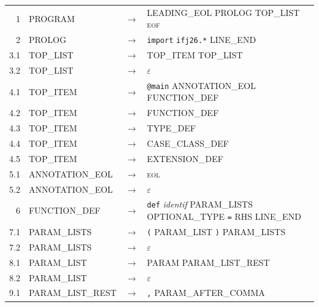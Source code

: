 \documentclass[11pt,a4paper]{article}
\begin{document}
 
{\small
\setlength{\tabcolsep}{4pt}
\begin{longtable}{r l c >{\raggedright\arraybackslash}p{6.6cm} >{\raggedright\arraybackslash}p{3.2cm}}
1 & \textsf{PROGRAM} & $\rightarrow$ & \textsf{LEADING\_EOL} \textsf{PROLOG} \textsf{TOP\_LIST} \textsc{eof} & {\scriptsize } \\
2 & \textsf{PROLOG} & $\rightarrow$ & \texttt{import} \texttt{ifj26.*} \textsf{LINE\_END} & {\scriptsize } \\
3.1 & \textsf{TOP\_LIST} & $\rightarrow$ & \textsf{TOP\_ITEM} \textsf{TOP\_LIST} & {\scriptsize } \\
3.2 & \textsf{TOP\_LIST} & $\rightarrow$ & $\varepsilon$ & {\scriptsize } \\
4.1 & \textsf{TOP\_ITEM} & $\rightarrow$ & \texttt{@main} \textsf{ANNOTATION\_EOL} \textsf{FUNCTION\_DEF} & {\scriptsize } \\
4.2 & \textsf{TOP\_ITEM} & $\rightarrow$ & \textsf{FUNCTION\_DEF} & {\scriptsize } \\
4.3 & \textsf{TOP\_ITEM} & $\rightarrow$ & \textsf{TYPE\_DEF} & {\scriptsize } \\
4.4 & \textsf{TOP\_ITEM} & $\rightarrow$ & \textsf{CASE\_CLASS\_DEF} & {\scriptsize } \\
4.5 & \textsf{TOP\_ITEM} & $\rightarrow$ & \textsf{EXTENSION\_DEF} & {\scriptsize } \\
5.1 & \textsf{ANNOTATION\_EOL} & $\rightarrow$ & \textsc{eol} & {\scriptsize } \\
5.2 & \textsf{ANNOTATION\_EOL} & $\rightarrow$ & $\varepsilon$ & {\scriptsize } \\
6 & \textsf{FUNCTION\_DEF} & $\rightarrow$ & \texttt{def} \textit{identif} \textsf{PARAM\_LISTS} \textsf{OPTIONAL\_TYPE} \texttt{=} \textsf{RHS} \textsf{LINE\_END} & {\scriptsize } \\
7.1 & \textsf{PARAM\_LISTS} & $\rightarrow$ & \texttt{(} \textsf{PARAM\_LIST} \texttt{)} \textsf{PARAM\_LISTS} & {\scriptsize } \\
7.2 & \textsf{PARAM\_LISTS} & $\rightarrow$ & $\varepsilon$ & {\scriptsize } \\
8.1 & \textsf{PARAM\_LIST} & $\rightarrow$ & \textsf{PARAM} \textsf{PARAM\_LIST\_REST} & {\scriptsize } \\
8.2 & \textsf{PARAM\_LIST} & $\rightarrow$ & $\varepsilon$ & {\scriptsize } \\
9.1 & \textsf{PARAM\_LIST\_REST} & $\rightarrow$ & \texttt{,} \textsf{PARAM\_AFTER\_COMMA} & {\scriptsize } \\

\end{longtable}}
\end{document}
